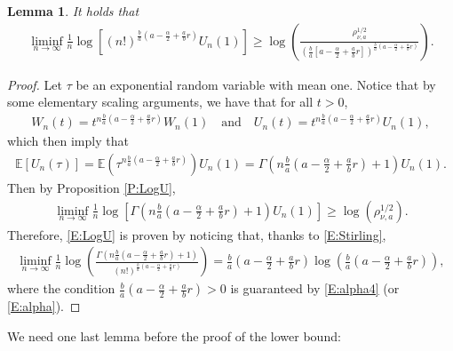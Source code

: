 \documentclass[a4paper,11pt]{article}
\numberwithin{equation}{section}
\numberwithin{equation}{section}
\theoremstyle{plain}
\newtheorem{lemma}[theorem]{Lemma}
\theoremstyle{definition}
\begin{document}
\begin{lemma} \label{L:LogU}
  It holds that
  \begin{align} \label{E:LogU}
    \liminf_{n\to \infty} \frac{1}{n}\log \left[ (n!)^{ \frac{b}{a}(a-\frac{\alpha}{2} + \frac{a}{b}r)} U_n(1) \right]
    \ge \log\left( \frac{\rho_{\nu,a}^{1/2}}{ \left(\frac{b}{a}[ a-\frac{\alpha}{2} + \frac{a}{b}r ]\right)^{\frac{b}{a}(a-\frac{\alpha}{2} + \frac{a}{b}r)} }\right).
  \end{align}
\end{lemma}
\begin{proof}
  Let $\tau$ be an exponential random variable with mean one. Notice that by some elementary scaling
  arguments, we have that for all $t>0$,
  \begin{align}
    \label{E:WU}
    W_n(t) = t^{n\frac{b}{a}\left(a- \frac{\alpha}{2}+\frac{a}{b}r \right)} W_n(1) \quad \text{and} \quad
    U_n(t) = t^{n\frac{b}{a}\left(a- \frac{\alpha}{2}+\frac{a}{b}r \right)} U_n(1),
  \end{align}
  which then imply that
  \begin{align*}
    \mathbb{E}\left[ U_n(\tau) \right] = \mathbb{E}\left( \tau^{n\frac{b}{a}(a-\frac{\alpha}{2}+\frac{a}{b}r)} \right) U_n(1)
                                       = \Gamma\left( n\frac{b}{a}\left(a-\frac{\alpha}{2} +\frac{a}{b}r \right) +1 \right) U_n(1).
  \end{align*}
  Then by Proposition \ref{P:LogU},
  \begin{align}\label{E:lb1}
    \liminf_{n\to \infty} \frac{1}{n} \log \left[ \Gamma\left( n\frac{b}{a}\left(a-\frac{\alpha}{2} +\frac{a}{b}r \right) +1 \right) U_n(1) \right] \ge \log\left(\rho_{\nu, a}^{1/2}\right).
  \end{align}
  Therefore, \eqref{E:LogU} is proven by noticing that, thanks to \eqref{E:Stirling},
  \begin{align*}
      \liminf_{n\to \infty} \frac{1}{n} \log \left( \frac{ \Gamma\left( n\frac{b}{a}\left(a-\frac{\alpha}{2} +\frac{a}{b}r \right) +1 \right) }{ (n!)^{\frac{b}{a}\left(a-\frac{\alpha}{2} +\frac{a}{b}r \right)} } \right )
    = \frac{b}{a}\left(a-\frac{\alpha}{2} +\frac{a}{b}r \right) \log\left( \frac{b}{a}\left(a-\frac{\alpha}{2} +\frac{a}{b}r \right) \right),
  \end{align*}
  where the condition $\frac{b}{a}\left(a-\frac{\alpha}{2} +\frac{a}{b}r \right) >0$ is guaranteed
  by \eqref{E:alpha4} (or \eqref{E:alpha}).
\end{proof}
We need one last lemma before the proof of the lower bound:
\end{document}
